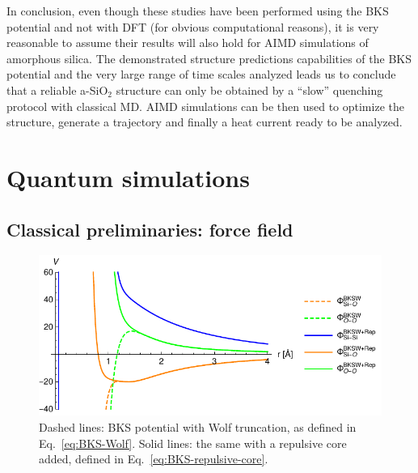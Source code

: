 \medskip
In conclusion, even though these studies have been performed using the BKS potential and not with DFT (for obvious computational reasons), it is very reasonable to assume their results will also hold for AIMD simulations of amorphous silica. 
The demonstrated structure predictions capabilities of the BKS potential and the very large range of time scales analyzed leads us to conclude that a reliable a-SiO$_2$ structure can only be obtained by a ``slow'' quenching protocol with classical MD. 
AIMD simulations can be then used to optimize the structure, generate a trajectory and finally a heat current ready to be analyzed. 



\section{Quantum simulations}  \label{sec:results-simulations}

\subsection{Classical preliminaries: force field}  \label{sec:results-class-force-field}
\begin{figure}[!tb]
    \centering
    \includegraphics[]{chapters/chapter6/figures/BKSW.pdf}
    \caption{Dashed lines: BKS potential with Wolf truncation, as defined in Eq.~\eqref{eq:BKS-Wolf}. Solid lines: the same with a repulsive core added, defined in Eq.~\eqref{eq:BKS-repulsive-core}.}
    \label{fig:BKS-potential}
\end{figure}

